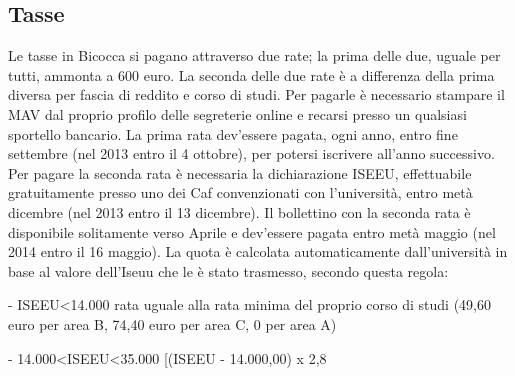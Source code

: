 \subsection{Tasse}

Le tasse in Bicocca si pagano attraverso due rate; la prima delle due, uguale per tutti, ammonta a 600 euro. La seconda delle due rate è a differenza della prima diversa per fascia di reddito e corso di studi.
Per pagarle è necessario stampare il MAV dal proprio profilo delle segreterie online e recarsi presso un qualsiasi sportello bancario. La prima rata dev'essere pagata, ogni anno, entro fine settembre (nel 2013 entro il 4 ottobre), per potersi iscrivere all'anno successivo. Per pagare la seconda rata è necessaria la dichiarazione ISEEU, effettuabile gratuitamente presso uno dei Caf convenzionati con l'università, entro metà dicembre (nel 2013 entro il 13 dicembre). 
Il bollettino con la seconda rata è disponibile solitamente verso Aprile e dev'essere pagata entro metà maggio (nel 2014 entro il 16 maggio). La quota è calcolata automaticamente dall'università in base al valore dell'Iseuu che le è stato trasmesso, secondo questa regola: 
  \item- ISEEU<14.000 rata uguale alla rata minima del proprio corso di studi (49,60 euro per area B, 74,40 euro per area C, 0 per area A) 
  \item- 14.000<ISEEU<35.000 [(ISEEU - 14.000,00) x 2,8%
